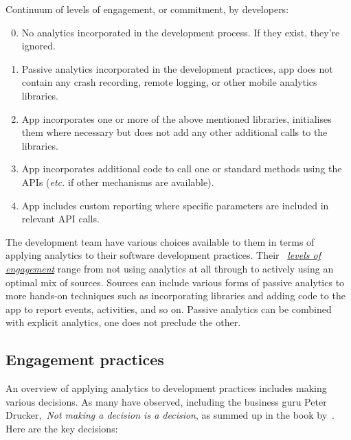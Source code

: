 Continuum of levels of engagement, or commitment, by developers:
\begin{enumerate}
    \setcounter{enumi}{-1} %
    \item No analytics incorporated in the development process. If they exist, they're ignored.
    \item Passive analytics incorporated in the development practices, app does not contain any crash recording, remote logging, or other mobile analytics libraries.
    \item App incorporates one or more of the above mentioned libraries, initialises them where necessary but does not add any other additional calls to the libraries.
    \item App incorporates additional code to call one or standard methods using the APIs (\emph{etc.} if other mechanisms are available).
    \item App includes custom reporting where specific parameters are included in relevant API calls.
\end{enumerate}

The development team have various choices available to them in terms of applying analytics to their software development practices. Their ~\href{subsection-levels-of-engagement}{\emph{levels of engagement}} range from not using analytics at all through to actively using an optimal mix of sources. 
Sources can include various forms of passive analytics to more hands-on techniques such as incorporating libraries and adding code to the app to report events, activities, and so on. 
Passive analytics can be combined with explicit analytics, one does not preclude the other.

\subsection{Engagement practices}
An overview of applying analytics to development practices includes making various decisions. As many have observed, including the business guru Peter Drucker,~\emph{Not making a decision is a decision}, as summed up in the book by~\cite{gunther2013truth_about_better_decision_making}. %
Here are the key decisions:

